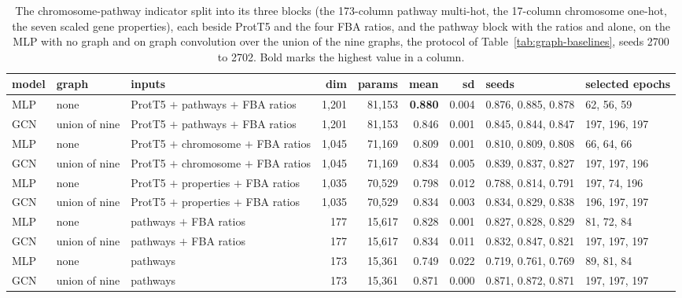 \begin{table}[H]
  \centering
  \footnotesize
  \caption[The indicator split, cheap models]{The chromosome-pathway indicator split into its three blocks (the 173-column pathway multi-hot, the 17-column chromosome one-hot, the seven scaled gene properties), each beside ProtT5 and the four FBA ratios, and the pathway block with the ratios and alone, on the MLP with no graph and on graph convolution over the union of the nine graphs, the protocol of Table~\ref{tab:graph-baselines}, seeds 2700 to 2702. Bold marks the highest value in a column.}
  \label{tab:graph-split}
  \begin{tabular}{@{}lllrrrrll@{}}
    \hline
    model & graph & inputs & dim & params & mean & sd & seeds & selected epochs \\
    \hline
    MLP & none & ProtT5 $+$ pathways $+$ FBA ratios & 1,201 & 81,153 & \textbf{0.880} & 0.004 & 0.876, 0.885, 0.878 & 62, 56, 59 \\
    GCN & union of nine & ProtT5 $+$ pathways $+$ FBA ratios & 1,201 & 81,153 & 0.846 & 0.001 & 0.845, 0.844, 0.847 & 197, 196, 197 \\
    MLP & none & ProtT5 $+$ chromosome $+$ FBA ratios & 1,045 & 71,169 & 0.809 & 0.001 & 0.810, 0.809, 0.808 & 66, 64, 66 \\
    GCN & union of nine & ProtT5 $+$ chromosome $+$ FBA ratios & 1,045 & 71,169 & 0.834 & 0.005 & 0.839, 0.837, 0.827 & 197, 197, 196 \\
    MLP & none & ProtT5 $+$ properties $+$ FBA ratios & 1,035 & 70,529 & 0.798 & 0.012 & 0.788, 0.814, 0.791 & 197, 74, 196 \\
    GCN & union of nine & ProtT5 $+$ properties $+$ FBA ratios & 1,035 & 70,529 & 0.834 & 0.003 & 0.834, 0.829, 0.838 & 196, 197, 197 \\
    MLP & none & pathways $+$ FBA ratios & 177 & 15,617 & 0.828 & 0.001 & 0.827, 0.828, 0.829 & 81, 72, 84 \\
    GCN & union of nine & pathways $+$ FBA ratios & 177 & 15,617 & 0.834 & 0.011 & 0.832, 0.847, 0.821 & 197, 197, 197 \\
    MLP & none & pathways & 173 & 15,361 & 0.749 & 0.022 & 0.719, 0.761, 0.769 & 89, 81, 84 \\
    GCN & union of nine & pathways & 173 & 15,361 & 0.871 & 0.000 & 0.871, 0.872, 0.871 & 197, 197, 197 \\
    \hline
  \end{tabular}
\end{table}
